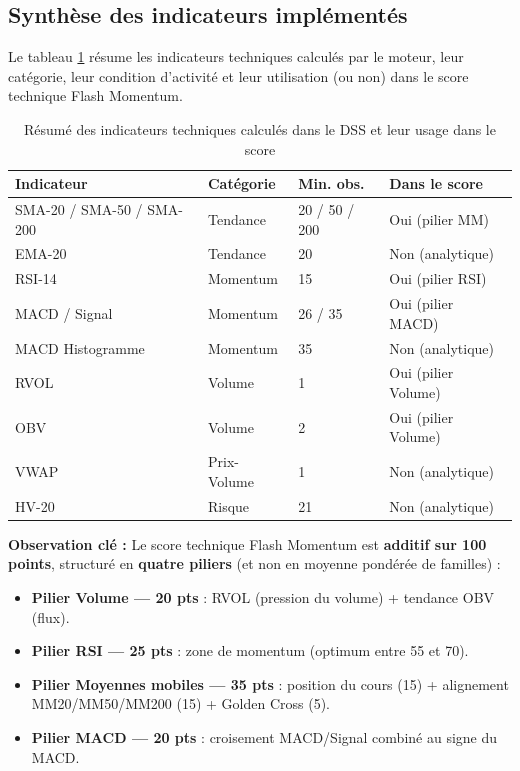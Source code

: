 \documentclass{rapportENSIAS} %
\begin{document}
\subsection{Synthèse des indicateurs implémentés}

\noindent
Le tableau \ref{tab:indicateurs-synthese} résume les indicateurs techniques calculés par le moteur, leur catégorie, leur condition d'activité et leur utilisation (ou non) dans le score technique Flash Momentum.

\begin{table}[H]
\centering
\small
\begin{tabular}{llll}
\toprule
\textbf{Indicateur} & \textbf{Catégorie} & \textbf{Min. obs.} & \textbf{Dans le score} \\
\midrule
SMA-20 / SMA-50 / SMA-200 & Tendance    & 20 / 50 / 200 & Oui (pilier MM) \\
EMA-20          & Tendance     & 20 & Non (analytique) \\
RSI-14          & Momentum     & 15 & Oui (pilier RSI) \\
MACD / Signal   & Momentum     & 26 / 35 & Oui (pilier MACD) \\
MACD Histogramme & Momentum    & 35 & Non (analytique) \\
RVOL            & Volume       & 1 & Oui (pilier Volume) \\
OBV             & Volume       & 2 & Oui (pilier Volume) \\
VWAP            & Prix-Volume  & 1 & Non (analytique) \\
HV-20           & Risque       & 21 & Non (analytique) \\
\bottomrule
\end{tabular}
\caption{Résumé des indicateurs techniques calculés dans le DSS et leur usage dans le score}
\label{tab:indicateurs-synthese}
\end{table}

\noindent
\textbf{Observation clé :} Le score technique Flash Momentum est \textbf{additif sur 100 points}, structuré en \textbf{quatre piliers} (et non en moyenne pondérée de familles) :

\begin{itemize}
    \item \textbf{Pilier Volume — 20 pts} : RVOL (pression du volume) + tendance OBV (flux).
    \item \textbf{Pilier RSI — 25 pts} : zone de momentum (optimum entre 55 et 70).
    \item \textbf{Pilier Moyennes mobiles — 35 pts} : position du cours (15) + alignement MM20/MM50/MM200 (15) + Golden Cross (5).
    \item \textbf{Pilier MACD — 20 pts} : croisement MACD/Signal combiné au signe du MACD.
\end{itemize}
\end{document}
